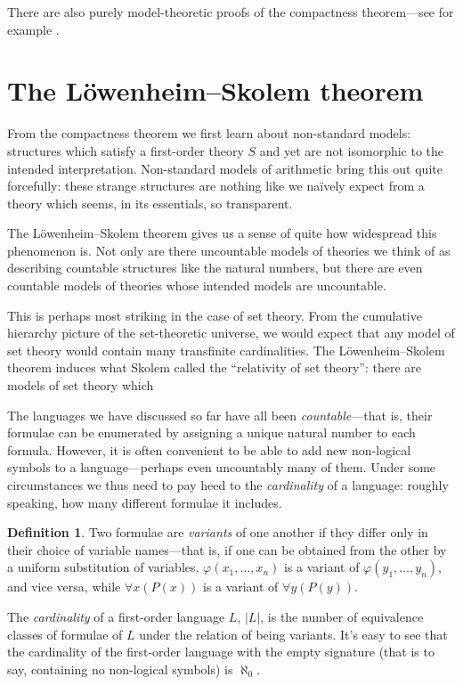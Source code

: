 \documentclass[10pt, a4paper, oneside]{article}
\theoremstyle{definition}
\newtheorem{dfn}[thm]{Definition}
\theoremstyle{remark}
\theoremstyle{plain}
\begin{document}
There are also purely model-theoretic proofs of the compactness theorem---see
for example \citet[pp. 125--127]{hodges1997}.


\section{The Löwenheim--Skolem theorem}

From the compactness theorem we first learn about non-standard models:
structures which satisfy a first-order theory $S$ and yet are not isomorphic to
the intended interpretation. Non-standard models of arithmetic bring this out
quite forcefully: these strange structures are nothing like we naïvely expect
from a theory which seems, in its essentials, so transparent.

The Löwenheim--Skolem theorem gives us a sense of quite how widespread this
phenomenon is. Not only are there uncountable models of theories we think of as
describing countable structures like the natural numbers, but there are even
countable models of theories whose intended models are uncountable.

This is perhaps most striking in the case of set theory. From the cumulative
hierarchy picture of the set-theoretic universe, we would expect that any model
of set theory would contain many transfinite cardinalities. The
Löwenheim--Skolem theorem induces what Skolem called the ``relativity of set
theory'': there are models of set theory which

The languages we have discussed so far have all been \emph{countable}---that is,
their formulae can be enumerated by assigning a unique natural number to each
formula. However, it is often convenient to be able to add new non-logical
symbols to a language---perhaps even uncountably many of them. Under some
circumstances we thus need to pay heed to the \emph{cardinality} of a language:
roughly speaking, how many different formulae it includes.

\begin{dfn}
    Two formulae are \emph{variants} of one another if they differ only in their
    choice of variable names---that is, if one can be obtained from the other by
    a uniform substitution of variables. $\varphi(x_1, \dotsc, x_n)$ is a
    variant of $\varphi(y_1, \dotsc, y_n)$, and vice versa, while
    $\forall{x} (P(x))$ is a variant of $\forall{y} (P(y))$.
    
    The \emph{cardinality} of a first-order language $L$, $|L|$, is the number
    of equivalence classes of formulae of $L$ under the relation of being
    variants. It's easy to see that the cardinality of the first-order language
    with the empty signature (that is to say, containing no non-logical symbols)
    is $\aleph_0$.
\end{dfn}
\end{document}
